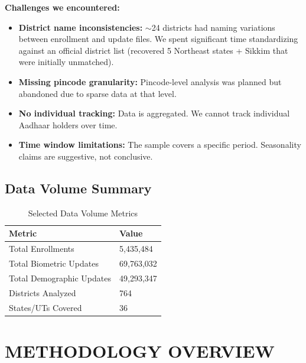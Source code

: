 \documentclass[11pt, a4paper]{article}
\begin{document}
\textbf{Challenges we encountered:}


\begin{itemize}
\item \textbf{District name inconsistencies:} $\sim$24 districts had naming variations between enrollment and update files. We spent significant time standardizing against an official district list (recovered 5 Northeast states + Sikkim that were initially unmatched).

\item \textbf{Missing pincode granularity:} Pincode-level analysis was planned but abandoned due to sparse data at that level.

\item \textbf{No individual tracking:} Data is aggregated. We cannot track individual Aadhaar holders over time.

\item \textbf{Time window limitations:} The sample covers a specific period. Seasonality claims are suggestive, not conclusive.
\end{itemize}

\subsection{Data Volume Summary}

\vspace{0.8em}
\begin{table}[H]
\caption{Selected Data Volume Metrics}
{\small
\begin{tabularx}{\textwidth}{|Y|Y|}
\hline
\textbf{Metric} & \textbf{Value} \\ \hline
Total Enrollments & 5,435,484 \\ \hline
Total Biometric Updates & 69,763,032 \\ \hline
Total Demographic Updates & 49,293,347 \\ \hline
Districts Analyzed & 764 \\ \hline
States/\allowbreak UTs Covered & 36 \\ \hline
\end{tabularx}
}
\end{table}
\vspace{1em}



\section{METHODOLOGY OVERVIEW}
\end{document}
